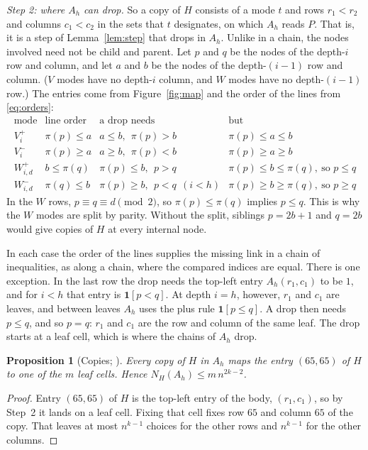 \documentclass{article}
\theoremstyle{plain}
\newtheorem{proposition}[theorem]{Proposition}
\theoremstyle{definition}
\begin{document}
\emph{Step 2: where $A_h$ can drop.} So a copy of $H$ consists of a mode $t$ and
rows $r_1<r_2$ and columns $c_1<c_2$ in the sets that $t$ designates, on which
$A_h$ reads $P$. That is, it is a step of Lemma~\ref{lem:step} that drops in
$A_h$. Unlike in a chain, the nodes involved need not be child and parent. Let
$p$ and $q$ be the nodes of the depth-$i$ row and column, and let $a$ and $b$ be
the nodes of the depth-$(i-1)$ row and column. ($V$ modes have no depth-$i$
column, and $W$ modes have no depth-$(i-1)$ row.) The entries come from
Figure~\ref{fig:map} and the order of the lines from \eqref{eq:orders}:
\[
\begin{array}{llll}
  \text{mode} & \text{line order} & \text{a drop needs} & \text{but}\\[2pt]
  V_i^+ & \pi(p)\le a & a\le b,\ \ \pi(p)>b & \pi(p)\le a\le b\\
  V_i^- & \pi(p)\ge a & a\ge b,\ \ \pi(p)<b & \pi(p)\ge a\ge b\\
  W_{i,d}^+ & b\le\pi(q) & \pi(p)\le b,\ \ p>q & \pi(p)\le b\le\pi(q),\ \text{so } p\le q\\
  W_{i,d}^- & \pi(q)\le b & \pi(p)\ge b,\ \ p<q\ \ (i<h) & \pi(p)\ge b\ge\pi(q),\ \text{so } p\ge q
\end{array}
\]
In the $W$ rows, $p\equiv q\equiv d\pmod 2$, so $\pi(p)\le\pi(q)$ implies
$p\le q$. This is why the $W$ modes are split by parity. Without the split,
siblings $p=2b+1$ and $q=2b$ would give copies of $H$ at every internal node.

In each case the order of the lines supplies the missing link in a chain of
inequalities, as along a chain, where the compared indices are equal. There is
one exception. In the last row the drop needs the top-left entry
$A_h(r_1,c_1)$ to be $1$, and for $i<h$ that entry is $\mathbf 1[p<q]$. At
depth $i=h$, however, $r_1$ and $c_1$ are leaves, and between leaves $A_h$ uses
the plus rule $\mathbf 1[p\le q]$. A drop then needs $p\le q$, and so $p=q$:
$r_1$ and $c_1$ are the row and column of the same leaf. The drop starts at a leaf cell, which is where the
chains of $A_h$ drop.

\begin{proposition}[Copies; {\cite[Proposition~4.6]{openai}}]\label{prop:copies}
Every copy of $H$ in $A_h$ maps the entry $(65,65)$ of $H$ to one of the $m$
leaf cells. Hence $N_H(A_h)\le m\,n^{2k-2}$.
\end{proposition}

\begin{proof}
Entry $(65,65)$ of $H$ is the top-left entry of the body, $(r_1,c_1)$, so by
Step~2 it lands on a leaf cell. Fixing that cell fixes row $65$ and column $65$
of the copy. That leaves at most $n^{k-1}$ choices for the other rows and
$n^{k-1}$ for the other columns.
\end{proof}
\end{document}

